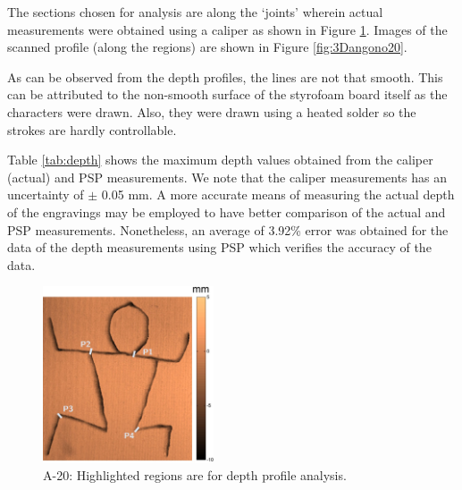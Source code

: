 The sections chosen for analysis are along the `joints' wherein actual measurements were obtained using a caliper as shown in Figure \ref{fig:angono20}. Images of the scanned profile (along the regions) are shown in Figure \ref{fig:3Dangono20}.

As can be observed from the depth profiles, the lines are not that smooth. This can be attributed to the non-smooth surface of the styrofoam board itself as the characters were drawn. Also, they were drawn using a heated solder so the strokes are hardly controllable. 

Table \ref{tab:depth} shows the maximum depth values obtained from the caliper (actual) and PSP  measurements. We note that the caliper measurements has an uncertainty of $\pm$ 0.05 mm. A more accurate means of measuring the actual depth of the engravings may be employed to have better comparison of the actual and PSP measurements. Nonetheless, an average of 3.92\% error was obtained for the data of the depth measurements using PSP which verifies the accuracy of the data.

\captionsetup[figure]{width=5in}
\begin{figure}[h!]
	\centering
	\includegraphics[width=0.45\textwidth]{figures/A20flat.jpg}
	\caption[Height map of sample Angono replica]{A-20: Highlighted regions are for depth profile analysis.}
	\label{fig:angono20}
\end{figure}

